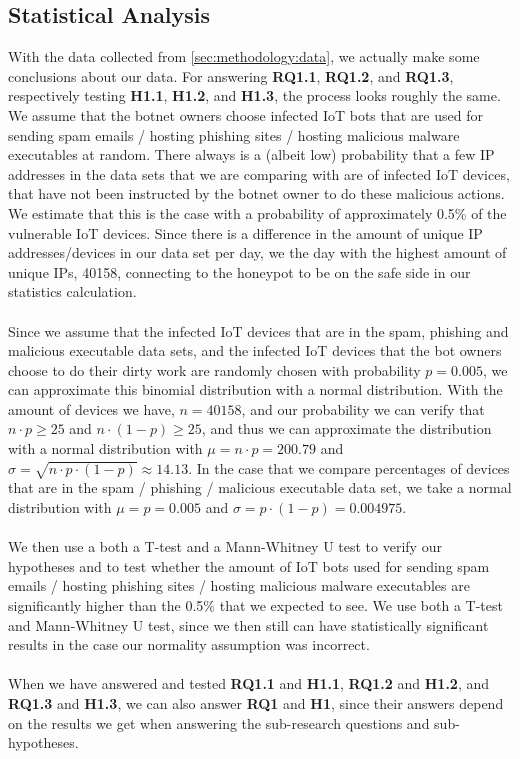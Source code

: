 \documentclass[a4paper,10pt]{article}
\begin{document}
\subsection{Statistical Analysis} \label{sec:methodology:stat_analysis}
With the data collected from \autoref{sec:methodology:data}, we actually make some conclusions about our data.
For answering \textbf{RQ1.1}, \textbf{RQ1.2}, and \textbf{RQ1.3}, respectively testing \textbf{H1.1}, \textbf{H1.2}, 
and \textbf{H1.3}, the process looks roughly the same. We assume that the botnet owners choose infected IoT bots 
that are used for sending spam emails / hosting phishing sites / hosting malicious malware executables at random.
There always is a (albeit low) probability that a few IP addresses in the data sets that we are comparing with are of 
infected IoT devices, that have not been instructed by the botnet owner to do these malicious actions. We estimate 
that this is the case with a probability of approximately 0.5\% of the vulnerable IoT devices. Since there is a difference 
in the amount of unique IP addresses/devices in our data set per day, we the day with the highest amount of unique 
IPs, 40158, connecting to the honeypot to be on the safe side in our statistics calculation.
\\\\
Since we assume that the infected IoT devices that are in the spam, phishing and malicious executable data sets, 
and the infected IoT devices that the bot owners choose to do their dirty work are randomly chosen with probability
$p = 0.005$, we can approximate this binomial distribution with a normal distribution. With the amount of devices
we have, $n = 40158$, and our probability we can verify that $n \cdot p \geq 25$ and $n \cdot (1-p) \geq 25$, and
thus we can approximate the distribution with a normal distribution with $\mu = n \cdot p = 200.79$ and 
$\sigma = \sqrt{n \cdot p \cdot (1-p)} \approx 14.13$. In the case that we compare percentages of devices that are
in the spam / phishing / malicious executable data set, we take a normal distribution with $\mu = p =0.005$ and 
$\sigma = p \cdot (1-p) = 0.004975$.
\\\\
We then use a both a T-test and a Mann-Whitney U test to verify our hypotheses and to  test whether the amount 
of IoT bots used for sending spam emails / hosting phishing sites / hosting malicious malware executables are 
significantly higher than the 0.5\% that we expected to see. We use both a T-test and Mann-Whitney U test,
since we then still can have statistically significant results in the case our normality assumption was incorrect.
\\\\
When we have answered and tested \textbf{RQ1.1} and \textbf{H1.1}, \textbf{RQ1.2} and \textbf{H1.2}, and 
\textbf{RQ1.3} and \textbf{H1.3}, we can also answer \textbf{RQ1} and \textbf{H1}, since their answers
depend on the results we get when answering the sub-research questions and sub-hypotheses.
\end{document}
